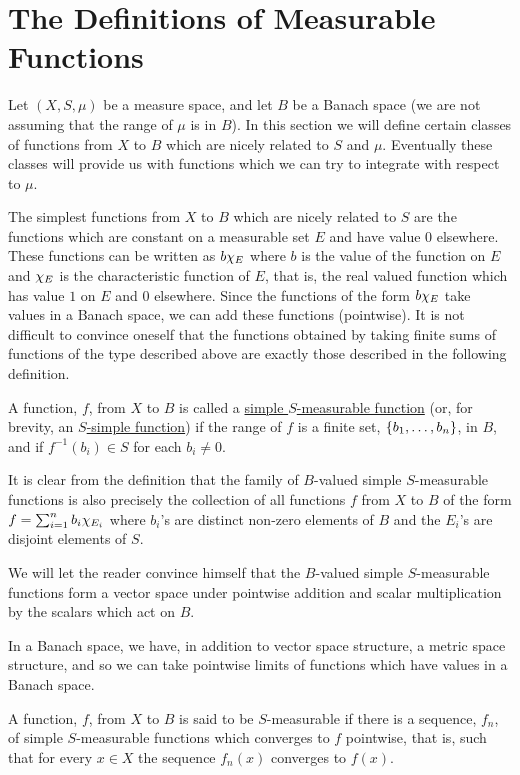 
\section{The Definitions of Measurable Functions}

Let $(X, S, \mu)$ be a measure space, and let $B$ be a Banach space (we are not assuming that the range of $\mu$ is in $B$). In this section we will define certain classes of functions from $X$ to $B$ which are nicely related to $S$ and $\mu$. Eventually these classes will provide us with functions which we can try to integrate with respect to $\mu$.

The simplest functions from $X$ to $B$ which are nicely related to $S$ are the functions which are constant on a measurable set $E$ and have value 0 elsewhere. These functions can be written as $b\chi_{E}$ where $b$ is the value of the function on $E$ and $\chi_{E}$ is the characteristic function of $E$, that is, the real valued function which has value $1$ on $E$ and 0 elsewhere. Since the functions of the form $b\chi_{E}$ take values in a Banach space, we can add these functions (pointwise). It is not difficult to convince oneself that the functions obtained by taking finite sums of functions of the type described above are exactly those described in the following definition.

\begin{definition}
A function, $f$, from $X$ to $B$ is called a \underline{simple $S$-measurable function} (or, for brevity, an \underline{$S$-simple function}) if the range of $f$ is a finite set, $\left\{b_1, \dots, b_n\right\}$, in $B$, and if $f^{-1}(b_i)\in S$ for each $b_i\neq0$.
\end{definition}

It is clear from the definition that the family of $B$-valued simple $S$-measurable functions is also precisely the collection of all functions $f$ from $X$ to $B$ of the form $f=\sum_{i=1}^nb_i\chi_{E_i}$ where $b_i$'s are distinct non-zero elements of $B$ and the $E_i$'s are disjoint elements of $S$.

We will let the reader convince himself that the $B$-valued simple $S$-measurable functions form a vector space under pointwise addition and scalar multiplication by the scalars which act on $B$.

In a Banach space, we have, in addition to vector space structure, a metric space structure, and so we can take pointwise limits of functions which have values in a Banach space.

\begin{definition}
A function, $f$, from $X$ to $B$ is said to be $S$-measurable if there is a sequence, $f_n$, of simple $S$-measurable functions which converges to $f$ pointwise, that is, such that for every $x\in X$ the sequence $f_n(x)$ converges to $f(x)$.
\end{definition}

